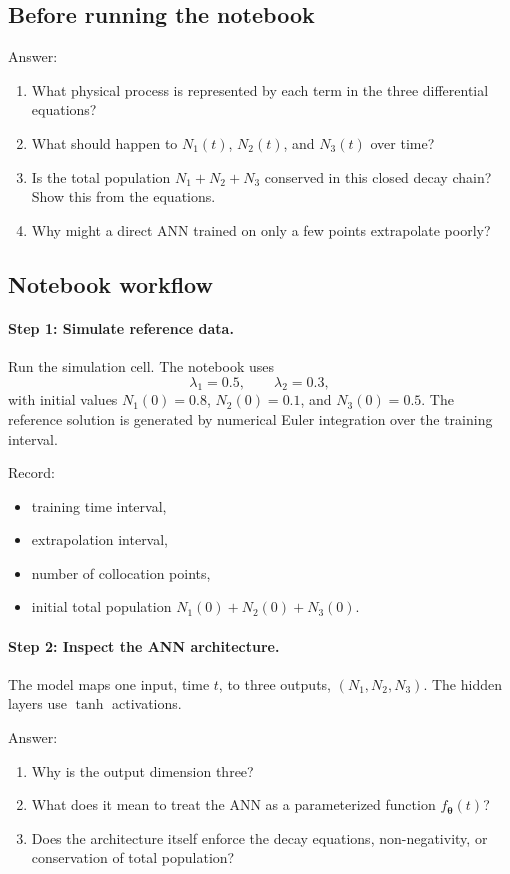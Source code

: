 \subsection*{Before running the notebook}
Answer:
\begin{enumerate}
    \item What physical process is represented by each term in the three differential equations?
    \item What should happen to \(N_1(t)\), \(N_2(t)\), and \(N_3(t)\) over time?
    \item Is the total population \(N_1+N_2+N_3\) conserved in this closed decay chain? Show this from the equations.
    \item Why might a direct ANN trained on only a few points extrapolate poorly?
\end{enumerate}

\subsection*{Notebook workflow}

\paragraph{Step 1: Simulate reference data.}
Run the simulation cell. The notebook uses
\[
\lambda_1=0.5,\qquad \lambda_2=0.3,
\]
with initial values \(N_1(0)=0.8\), \(N_2(0)=0.1\), and \(N_3(0)=0.5\). The reference solution is generated by numerical Euler integration over the training interval.

Record:
\begin{itemize}
    \item training time interval,
    \item extrapolation interval,
    \item number of collocation points,
    \item initial total population \(N_1(0)+N_2(0)+N_3(0)\).
\end{itemize}

\paragraph{Step 2: Inspect the ANN architecture.}
The model maps one input, time \(t\), to three outputs, \((N_1,N_2,N_3)\). The hidden layers use \(\tanh\) activations.

Answer:
\begin{enumerate}
    \item Why is the output dimension three?
    \item What does it mean to treat the ANN as a parameterized function \(f_{\bm{\theta}}(t)\)?
    \item Does the architecture itself enforce the decay equations, non-negativity, or conservation of total population?
\end{enumerate}


